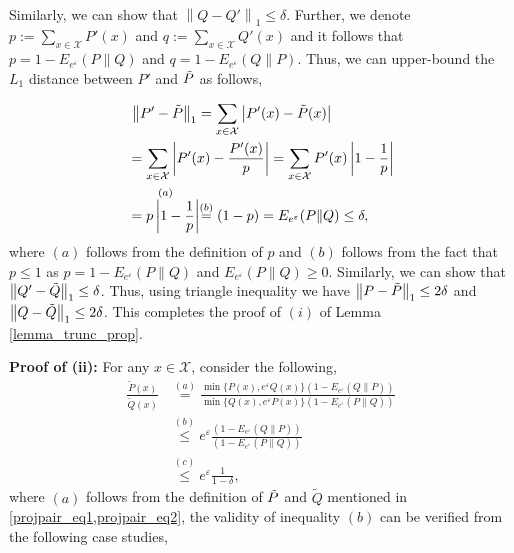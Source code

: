 \documentclass[onecolumn,ldraftcls, 11pt]{IEEEtran}
\newcommand{\nn}{\nonumber}
\newcommand{\eps}{\varepsilon}
\newcommand*{\cX}{\mathcal{X}}
\newcommand{\norm}[2]{{\left\lVert #1 \right\rVert}_{#2}}
\newcommand{\abs}[1]{\left\vert#1\right\vert}
\begin{document}
Similarly, we can show that $\norm{Q - Q'}{1} \leq \delta$. Further, we denote $p := \sum_{x \in \cX}P'(x)$ and $q := \sum_{x \in \cX}Q'(x)$ and it follows that $p = 1 - E_{e^\eps}(P\|Q)$ and $q = 1 - E_{e^\eps}(Q\|P)$. Thus, we can upper-bound the $L_1$ distance between $P'$ and $\Tilde{P}$ as follows,

\begin{align*}
    &~ \norm{P' - \Tilde{P}}{1} 
    = \sum_{x \in \cX} \abs{P'(x) - \Tilde{P}(x)}\\
    &= \sum_{x \in \cX} \abs{P'(x) - \frac{P'(x)}{p}}
    = \sum_{x \in \cX} P'(x)\abs{1 - \frac{1}{p}}\\
    &\overset{(a)}{= p\abs{1 - \frac{1}{p}}}
    \overset{(b)}{=} (1-p)
     = E_{e^\eps}(P\|Q) \leq \delta,
\end{align*}
where $(a)$ follows from the definition of $p$ and $(b)$ follows from the fact that $p \leq 1$ as $p = 1 - E_{e^\eps}(P\|Q)$ and $E_{e^\eps}(P\|Q) \geq 0$. Similarly, we can show that $\norm{Q' - \Tilde{Q}}{1} \leq \delta$. Thus, using triangle inequality we have $\norm{P - \Tilde{P}}{1} \leq 2\delta$ and $\norm{Q - \Tilde{Q}}{1} \leq 2\delta$.
This completes the proof of $(i)$ of Lemma \ref{lemma_trunc_prop}.

\textbf{Proof of (ii):} For any $x \in \cX$, consider the following,
\begin{align}
    \frac{\tilde{P}(x)}{\tilde{Q}(x)} &\overset{(a)}{=} \frac{\min\{P(x),e^\eps Q(x)\}( 1 - E_{e^\eps}(Q\|P))}{\min\{Q(x),e^\eps P(x)\}  (1 - E_{e^\eps}(P\|Q))}\nn\\
    &\overset{(b)}{\leq} e^\eps \frac{( 1 - E_{e^\eps}(Q\|P))}{  (1 - E_{e^\eps}(P\|Q))}\nn\\
    &\overset{(c)}{\leq} e^\eps \frac{1}{1-\delta}\label{eq_max_div_bound},
\end{align}
where $(a)$ follows from the definition of $\Tilde{P}$ and $\tilde{Q}$ mentioned in \cref{projpair_eq1,projpair_eq2}, the validity of inequality $(b)$ can be verified from the following case studies,
\end{document}

